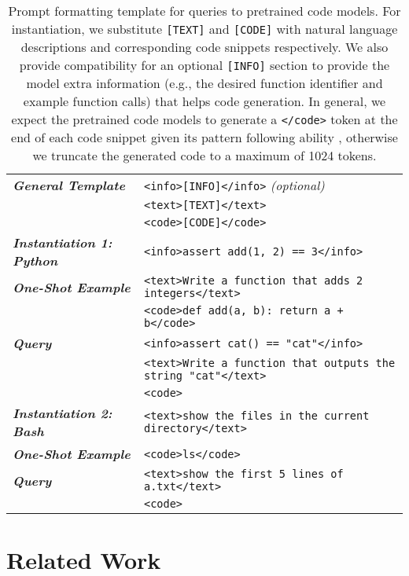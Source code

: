 \documentclass[11pt]{article}
\begin{document}
\begin{table*}[t]
    \centering \small
    \begin{tabular}{l|l}
        \toprule
        \textbf{\textit{General Template}} & \texttt{{<info>[INFO]</info>}} \qquad \textit{(optional)} \\
        & \texttt{{<text>[TEXT]</text>}} \\
        & \texttt{{<code>}[CODE]</code>} \\
        \midrule \midrule
        \textbf{\textit{Instantiation 1: Python}} & \texttt{<info>assert add(1, 2) == 3</info>}  \\
        \textbf{\textit{One-Shot Example}} & \texttt{<text>Write a function that adds 2 integers</text>} \\
        & \texttt{<code>def add(a, b): return a + b</code>} \\
        \midrule
        \textbf{\textit{Query}} & \texttt{<info>assert cat() == "cat"</info>}  \\
        & \texttt{<text>Write a function that outputs the string "cat"</text>} \\
        & \texttt{<code>} \\
        \midrule \midrule 
        \textbf{\textit{Instantiation 2: Bash}} & \texttt{<text>show the files in the current directory</text>} \\
        \textbf{\textit{One-Shot Example}} & \texttt{<code>ls</code>} \\
        \midrule
        \textbf{\textit{Query}} & \texttt{<text>show the first 5 lines of a.txt</text>}  \\
        & \texttt{<code>} \\
        \bottomrule
    \end{tabular}
    \caption{\label{tab:prompt-format} Prompt formatting template for queries to pretrained code models. For instantiation, we substitute \texttt{[TEXT]} and \texttt{[CODE]} with natural language descriptions and corresponding code snippets respectively. We also provide compatibility for an optional \texttt{[INFO]} section to provide the model extra information (e.g., the desired function identifier and example function calls) that helps code generation. In general, we expect the pretrained code models to generate a \texttt{</code>} token at the end of each code snippet given its pattern following ability \citep{brown2020language,chen2021evaluating}, otherwise we truncate the generated code to a maximum of 1024 tokens. }
\end{table*}  \section{Related Work}
\label{sec:related}
\end{document}
